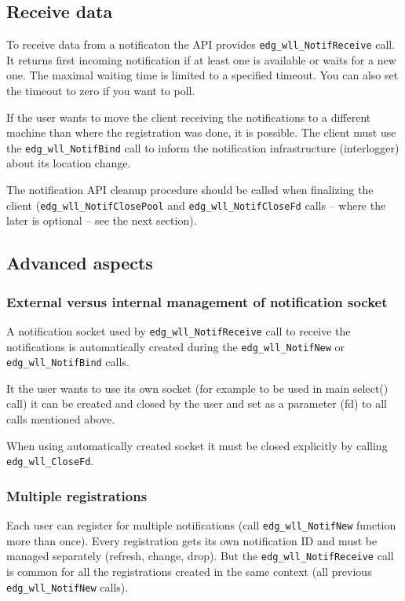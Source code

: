 \subsection{Receive data}
To receive data from a notificaton the API provides
\verb'edg_wll_NotifReceive' call. It returns first incoming
notification if at least one is available or waits for a new one. The
maximal waiting time is limited to a specified timeout. You can also set the
timeout to zero if you want to poll.

If the user wants to move the client receiving the notifications to a different
machine than where the registration was done, it is possible. The
client must use the \verb'edg_wll_NotifBind' call to inform the
notification infrastructure (interlogger) about its location change.

The notification API cleanup procedure should be called when
finalizing the client (\verb'edg_wll_NotifClosePool' and 
\verb'edg_wll_NotifCloseFd' calls -- where the later is optional 
-- see the next section).

\subsection{Advanced aspects}

\subsubsection{External versus internal management of notification socket}
A notification socket used by \verb'edg_wll_NotifReceive' call to
receive the notifications is automatically created during the
\verb'edg_wll_NotifNew' or \verb'edg_wll_NotifBind' calls.

It the user wants to use its own socket (for example to be used in
main select() call) it can be created and closed by the user and set
as a parameter (fd) to all calls mentioned above.

When using automatically created socket it must be closed explicitly
by calling \verb'edg_wll_CloseFd'.

\subsubsection{Multiple registrations}
Each user can register for multiple notifications (call
\verb'edg_wll_NotifNew' function more than once). Every registration
gets its own notification ID and must be managed separately (refresh,
change, drop). But the \verb'edg_wll_NotifReceive' call is common for
all the registrations created in the same context (all previous
\verb'edg_wll_NotifNew' calls). 

